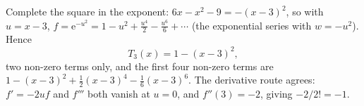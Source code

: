 \begin{solutions}
  \item Complete the square in the exponent:
        $6x-x^{2}-9=-(x-3)^{2}$, so with $u=x-3$,
        $f=\mathrm{e}^{-u^{2}}=1-u^{2}+\tfrac{u^{4}}{2}-\tfrac{u^{6}}{6}
        +\cdots$ (the exponential series with $w=-u^{2}$). Hence
        \[
          T_{3}(x)=1-(x-3)^{2},
        \]
        two non-zero terms only, and the first four non-zero terms are
        $1-(x-3)^{2}+\tfrac12(x-3)^{4}-\tfrac16(x-3)^{6}$. The derivative
        route agrees: $f'=-2uf$ and $f'''$ both vanish at $u=0$, and
        $f''(3)=-2$, giving $-2/2!=-1$.
\end{solutions}
